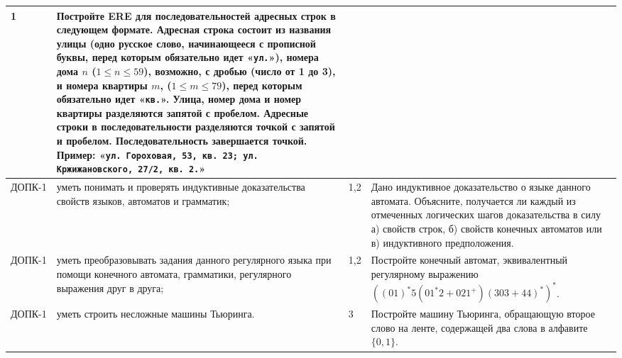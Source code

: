 \documentclass[a4paper,12pt]{article}
\begin{document}
\begin{longtable}{|p{15mm}|p{42mm}|p{17mm}|p{70mm}|}
1 & 
Постройте ERE для последовательностей адресных строк в следующем формате.
Адресная строка состоит из названия улицы (одно русское слово, начинающееся с прописной буквы,
перед которым обязательно идет «{\tt ул.}»), номера дома $n$
(\mbox{$1 \leqslant n \leqslant 59$}), возможно, с дробью (число от 1 до 3), и номера
квартиры $m$, ($1 \leqslant m \leqslant 79$), перед которым обязательно идет
«{\tt кв.}». Улица, номер дома и номер квартиры разделяются запятой с пробелом. Адресные
строки в последовательности разделяются точкой с запятой и пробелом. Последовательность
завершается точкой. Пример:
«{\tt ул. Гороховая, 53, кв. 23; ул. Кржижановского, 27/2, кв. 2.}» 
\\
\hline
ДОПК-1 & 
уметь понимать и проверять индуктивные доказательства свойств языков, автоматов и грамматик; & 
1,2 & 
Дано индуктивное доказательство о языке данного автомата. Объясните, получается ли
каждый из отмеченных логических шагов доказательства в силу
а) свойств строк, б) свойств конечных автоматов или в) индуктивного предположения. 
\\
\hline
ДОПК-1 & 
уметь преобразовывать задания данного регулярного языка при помощи конечного автомата, грамматики, регулярного выражения друг в друга; & 
1,2 & 
Постройте конечный автомат, эквивалентный регулярному выражению $((01)^*5(01^*2 + 021^+)(303+44)^*)^*$. 
\\
\hline
ДОПК-1 & 
уметь строить несложные машины Тьюринга. & 
3 & 
Постройте машину Тьюринга, обращающую второе слово на ленте, содержащей два слова в алфавите $\{0,1\}$. 
\\
\hline
\end{longtable}
\end{document}
